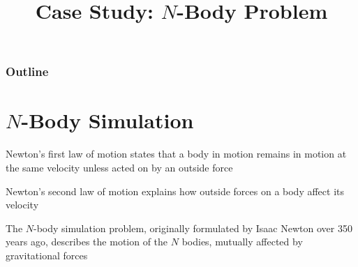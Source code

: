 \documentclass[8pt,a4paper,compress,handout]{beamer}
\title{Case Study: $N$-Body Problem}
\date{}
\begin{document}
\begin{frame}
\vfill
\titlepage
\end{frame}

\begin{frame}
\frametitle{Outline}
\tableofcontents
\end{frame}

\section{$N$-Body Simulation}
\begin{frame}[fragile]
Newton's first law of motion states that a body in motion remains in motion at the same velocity unless acted on by an outside force

\bigskip

Newton's second law of motion explains how outside forces on a body affect its velocity

\bigskip

The $N$-body simulation problem, originally formulated by Isaac Newton over 350 years ago, describes the motion of the $N$ bodies, mutually affected by gravitational forces
\end{frame}
\end{document}
